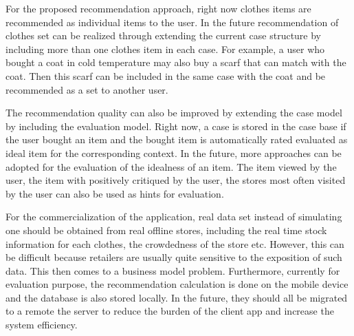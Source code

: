 For the proposed recommendation approach, right now clothes items are recommended as individual items to the user. In the future recommendation of clothes set can be realized through extending the current case structure by including more than one clothes item in each case. For example, a user who bought a coat in cold temperature may also buy a scarf that can match with the coat. Then this scarf can be included in the same case with the coat and be recommended as a set to another user.

The recommendation quality can also be improved by extending the case model by including the evaluation model. Right now, a case is stored in the case base if the user bought an item and the bought item is automatically rated evaluated as ideal item for the corresponding context. In the future, more approaches can be adopted for the evaluation of the idealness of an item. The item viewed by the user, the item with positively critiqued by the user, the stores most often visited by the user can also be used as hints for evaluation. 

For the commercialization of the application, real data set instead of simulating one should be obtained from real offline stores, including the real time stock information for each clothes, the crowdedness of the store etc. However, this can be difficult because retailers are usually quite sensitive to the exposition of such data. This then comes to a business model problem. Furthermore, currently for evaluation purpose, the recommendation calculation is done on the mobile device and the database is also stored locally. In the future, they should all be migrated to a remote the server to reduce the burden of the client app and increase the system efficiency.

